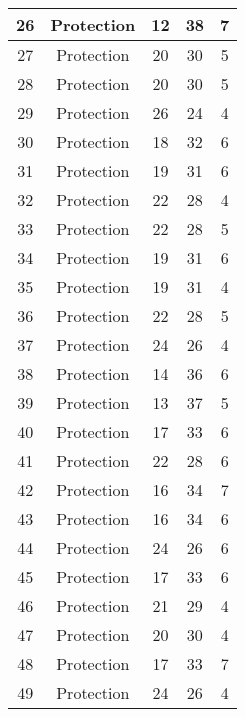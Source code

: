 \documentclass[results.tex]{subfiles}
\begin{document}
\begin{center}
\begin{tabular}{| c || c | c | c | c |}
    \hline
    26 & Protection & 12 & 38 & 7 \\ 
    \hline
    27 & Protection & 20 & 30 & 5 \\ 
    \hline
    28 & Protection & 20 & 30 & 5 \\ 
    \hline
    29 & Protection & 26 & 24 & 4 \\ 
    \hline
    30 & Protection & 18 & 32 & 6 \\ 
    \hline
    31 & Protection & 19 & 31 & 6 \\ 
    \hline
    32 & Protection & 22 & 28 & 4 \\ 
    \hline
    33 & Protection & 22 & 28 & 5 \\ 
    \hline
    34 & Protection & 19 & 31 & 6 \\ 
    \hline
    35 & Protection & 19 & 31 & 4 \\ 
    \hline
    36 & Protection & 22 & 28 & 5 \\ 
    \hline
    37 & Protection & 24 & 26 & 4 \\ 
    \hline
    38 & Protection & 14 & 36 & 6 \\ 
    \hline
    39 & Protection & 13 & 37 & 5 \\ 
    \hline
    40 & Protection & 17 & 33 & 6 \\ 
    \hline
    41 & Protection & 22 & 28 & 6 \\ 
    \hline
    42 & Protection & 16 & 34 & 7 \\ 
    \hline
    43 & Protection & 16 & 34 & 6 \\ 
    \hline
    44 & Protection & 24 & 26 & 6 \\ 
    \hline
    45 & Protection & 17 & 33 & 6 \\ 
    \hline
    46 & Protection & 21 & 29 & 4 \\ 
    \hline
    47 & Protection & 20 & 30 & 4 \\ 
    \hline
    48 & Protection & 17 & 33 & 7 \\ 
    \hline
    49 & Protection & 24 & 26 & 4 \\ 
    \hline   \end{tabular}
\end{center}
\end{document}

